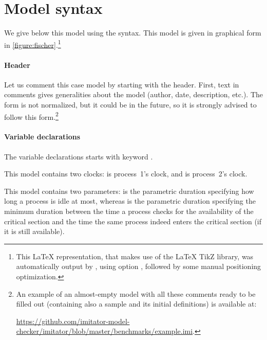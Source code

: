 \section{Model syntax}

We give below this model using the \imitator{} syntax.
This model is given in graphical form in \cref{figure:fischer}.\footnote{%
	This \LaTeX{} representation, that makes use of the \LaTeX{} TikZ library, was automatically output by \imitator{}, using option , followed by some manual positioning optimization.
}

\bigskip





\paragraph{Header}
Let us comment this case model by starting with the header.
First, text in comments gives generalities about the model (author, date, description, etc.).
The form is not normalized, but it could be in the future, so it is strongly advised to follow this form.\footnote{%
	An example of an almost-empty model with all these comments ready to be filled out (containing also a sample \IPTA{} and its initial definitions) is available at:

	\url{https://github.com/imitator-model-checker/imitator/blob/master/benchmarks/example.imi}.
}

\paragraph{Variable declarations}
The variable declarations starts with keyword .

This model contains two clocks:  is process~1's clock, and  is process~2's clock.

This model contains two parameters:  is the parametric duration specifying how long a process is idle at most, whereas  is the parametric duration specifying the minimum duration between the time a process checks for the availability of the critical section and the time the same process indeed enters the critical section (if it is still available).


